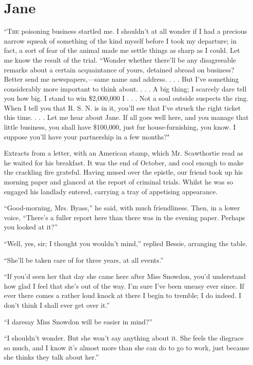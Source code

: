 \chapter{Jane}

\textsc{``The} poisoning business startled me. I shouldn't at all wonder
if I had a precious narrow squeak of something of the kind myself before
I took my departure; in fact, a sort of fear of the animal made me
settle things as sharp as I could. Let me know the result of the trial.
``Wonder whether there'll be any disagreeable remarks about a certain
acquaintance of yours, detained abroad on business? Better send me
newspapers,---same name and address. . . . But I've something
considerably more important to think about. . . . A big thing; I
scarcely dare tell you how big. I stand to win \$2,000,000 I . . . Not a
soul outside suspects the ring. When I tell you that R. S. N. is in it,
you'll see that I've struck the right ticket this time. . . . Let me
hear about Jane. If all goes well here, and you manage that little
business, you shall have \$100,000, just fur
{\protect\hypertarget{286}{}{}} house-furnishing, you know. I suppose
you'll have your partnership in a few months?"

Extracts from a letter, with an American stamp, which Mr. Scawthortie
read as he waited for his breakfast. It was the end of October, and cool
enough to make the crackling fire grateful. Having mused over the
epistle, our friend took up his morning paper and glanced at the report
of criminal trials. Whilst he was so engaged his landlady entered,
carrying a tray of appetising appearance.

``Good-morning, Mrs. Byass,'' he said, with much friendliness. Then, in
a lower voice, ``There's a fuller report here than there was in the
evening paper. Perhaps you looked at it?''

``Well, yes, sir; I thought you wouldn't mind,'' replied Bessie,
arranging the table.

``She'll be taken care of for three years, at all events.''

``If you'd seen her that day she came here after Miss Snowdon, you'd
understand how glad I feel that she's out of the way. I'm sure I've been
uneasy ever since. If ever there comes a rather loud knock at there I
begin to tremble; I do indeed. I don't think I shall ever get over it.''

{\protect\hypertarget{287}{}{}} ``I daresay Miss Snowdon will be easier
in mind?''

``I shouldn't wonder. But she won't say anything about it. She feels the
disgrace so much, and I know it's almost more than she can do to go to
work, just because she thinks they talk about her.''

